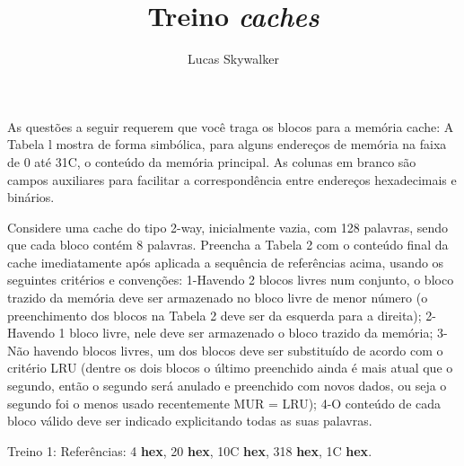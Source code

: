 \documentclass{article}
\author{Lucas Skywalker}
\title{Treino \textit{caches}}
\begin{document}
As questões a seguir requerem que você traga os blocos para a memória cache: A 
Tabela l mostra de forma simbólica, para alguns endereços de memória
na faixa de 0 até 31C, o conteúdo da memória principal. As colunas em branco
são campos auxiliares para facilitar a correspondência entre endereços
hexadecimais e binários.

Considere uma cache do tipo 2-way, inicialmente vazia, com 128 palavras, sendo
que cada bloco contém 8 palavras. Preencha a Tabela 2 com o conteúdo final da
cache imediatamente após aplicada a sequência de referências acima, usando os
seguintes critérios e convenções: 1-Havendo 2 blocos livres num conjunto, o
bloco trazido da memória deve ser armazenado no bloco livre de menor número (o
preenchimento dos blocos na Tabela 2 deve ser da esquerda para a direita);
2-Havendo 1 bloco livre, nele deve ser armazenado o bloco trazido da memória;
3-Não havendo blocos livres, um dos blocos deve ser substituído de acordo com o
critério LRU (dentre os dois blocos o último preenchido ainda é mais atual que o
segundo, então o segundo será anulado e preenchido com novos dados, ou seja o
segundo foi o menos usado recentemente MUR = LRU); 4-O conteúdo de cada bloco
válido deve ser indicado explicitando todas as suas palavras.

\clearpage

Treino 1: Referências: 4 \textbf{\tiny hex}, 20 \textbf{\tiny hex}, 10C 
\textbf{\tiny hex}, 318 \textbf{\tiny hex}, 1C \textbf{\tiny hex}.

\end{document}
